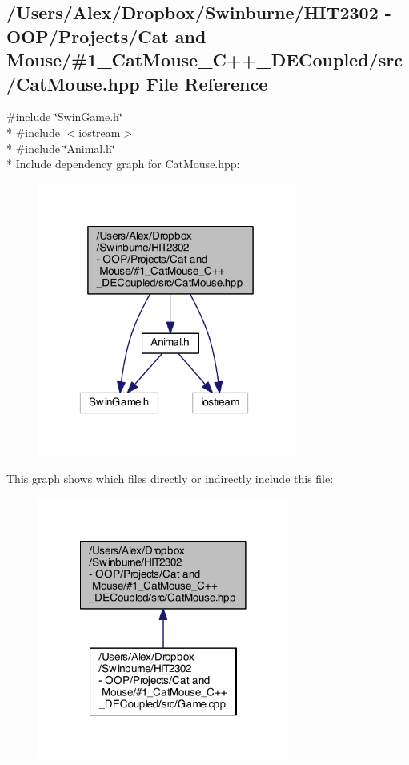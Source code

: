 \subsection{/\-Users/\-Alex/\-Dropbox/\-Swinburne/\-H\-I\-T2302 -\/ O\-O\-P/\-Projects/\-Cat and Mouse/\#1\-\_\-\-Cat\-Mouse\-\_\-\-C++\-\_\-\-D\-E\-Coupled/src/\-Cat\-Mouse.hpp File Reference}
\label{_cat_mouse_8hpp}
{\ttfamily \#include \char`\"{}Swin\-Game.\-h\char`\"{}}\\*
{\ttfamily \#include $<$iostream$>$}\\*
{\ttfamily \#include \char`\"{}Animal.\-h\char`\"{}}\\*
Include dependency graph for Cat\-Mouse.\-hpp\-:
\nopagebreak
\begin{figure}[H]
\begin{center}
\leavevmode
\includegraphics[width=241pt]{_cat_mouse_8hpp__incl}
\end{center}
\end{figure}
This graph shows which files directly or indirectly include this file\-:
\nopagebreak
\begin{figure}[H]
\begin{center}
\leavevmode
\includegraphics[width=234pt]{_cat_mouse_8hpp__dep__incl}
\end{center}
\end{figure}
